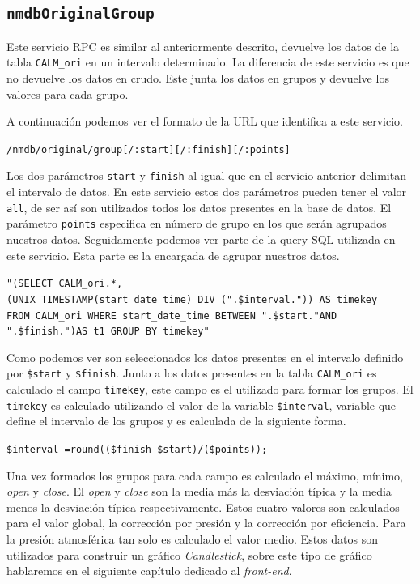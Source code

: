 	\subsection{\texttt{nmdbOriginalGroup}}
		Este servicio RPC es similar al anteriormente descrito, devuelve los datos de la tabla \texttt{CALM\_ori} en un intervalo determinado.
		La diferencia de este servicio es que no devuelve los datos en crudo. Este junta los datos en grupos y devuelve los valores para
		cada grupo. 
		\par
		A continuación podemos ver el formato de la URL que identifica a este servicio.
			\begin{center} \texttt{/nmdb/original/group[/:start][/:finish][/:points]}  \end{center} 
		Los dos parámetros \texttt{start} y \texttt{finish} al igual que en el servicio anterior delimitan el intervalo de datos. En este
		servicio estos dos parámetros pueden tener el valor \texttt{all}, de ser así son utilizados todos los datos presentes en la base de
		datos. El parámetro \texttt{points} especifica en número de grupo en los que serán agrupados nuestros datos.
		Seguidamente podemos ver parte de la query SQL utilizada en este servicio. Esta parte es la encargada de agrupar nuestros datos.
			\begin{center} \texttt{"(SELECT CALM\_ori.*,
			  		\\	(UNIX\_TIMESTAMP(start\_date\_time) DIV (".\$interval.")) AS timekey  
				      	\\	FROM CALM\_ori WHERE start\_date\_time BETWEEN \cc".\$start."\cc AND \cc".\$finish."\cc)AS t1  GROUP BY timekey"}
			\end{center} 
		Como podemos ver son seleccionados los datos presentes en el intervalo definido por \texttt{\$start} y \texttt{\$finish}. Junto a los datos
		presentes en la tabla \texttt{CALM\_ori} es calculado el campo \texttt{timekey}, este campo es el utilizado para formar los grupos. El 
		\texttt{timekey} es calculado utilizando el valor de la variable \texttt{\$interval}, variable que define el intervalo de los grupos
		y es calculada de la siguiente forma.
			\begin{center} \texttt{\$interval =round((\$finish-\$start)/(\$points));}  \end{center} 
		Una vez formados los grupos para cada campo es calculado el máximo, mínimo, \emph{open} y \emph{close}. El \emph{open} y \emph{close}
		son la media más la desviación típica y la media menos la desviación típica respectivamente. Estos cuatro valores son calculados para el
		valor global, la corrección por presión y la corrección por eficiencia. Para la presión atmosférica tan solo es calculado el valor
		medio. Estos datos son utilizados para construir un gráfico \emph{Candlestick}, sobre este tipo de gráfico hablaremos en el
		siguiente capítulo dedicado al \emph{front-end}.
